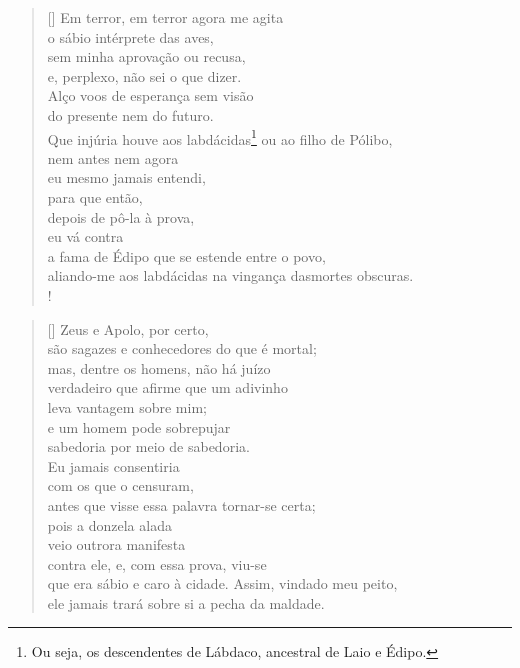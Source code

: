 \settowidth{\versewidth}{a fama de Édipo que se estende entre o povo,x}
\begin{verse}[\versewidth]
Em terror, em terror agora me agita\\ 
o sábio intérprete das aves,\\
sem minha aprovação ou recusa,\\
e, perplexo, não sei o que dizer.\\
Alço voos de esperança sem visão\\
do presente nem do futuro.\\
Que injúria houve aos labdácidas\footnote{Ou seja, os descendentes de Lábdaco, ancestral de Laio e Édipo.}
\qb ou ao filho de Pólibo,\\
nem antes nem agora\\
eu mesmo jamais entendi,\\
para que então,\\
depois de pô-la à prova,\\
eu vá contra\\
a fama de Édipo que se estende entre o povo,\\
aliando-me aos labdácidas na vingança das\qb mortes obscuras.\\!
\end{verse}
\settowidth{\versewidth}{ele jamais trará sobre si a pecha da maldade.x}
\begin{verse}[\versewidth]
Zeus e Apolo, por certo,\\ 
são sagazes e conhecedores do que é mortal;\\
mas, dentre os homens, não há juízo\\
verdadeiro que afirme que um adivinho\\
leva vantagem sobre mim;\\
e um homem pode sobrepujar\\
sabedoria por meio de sabedoria.\\
Eu jamais consentiria\\
com os que o censuram,\\
antes que visse essa palavra tornar-se certa;\\
pois a donzela alada\\
veio outrora manifesta\\
contra ele, e, com essa prova, viu-se\\
que era sábio e caro à cidade. Assim, vinda\qb do meu peito,\\
ele jamais trará sobre si a pecha da maldade.
\end{verse}

